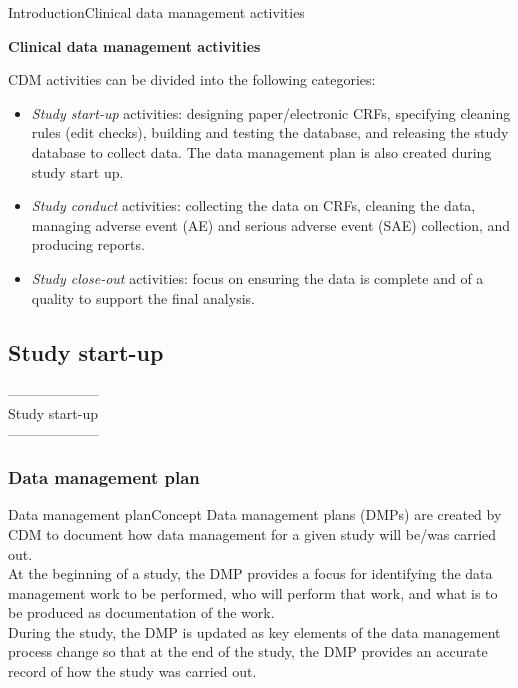 \documentclass[xcolor=dvipsnames,11pt]{beamer}
\begin{document}
\begin{frame}[fragile]{Introduction}{Clinical data management activities}

	\textbf{Clinical data management activities}\\
	\bigskip

	CDM activities can be divided into the following categories:  
	\begin{itemize}
		\item \textcolor{PineGreen}{\textit{Study start-up}} activities: designing paper/electronic CRFs, specifying cleaning rules (edit checks), building and testing the database, and releasing the study database to collect data. The data management plan is also created during study start up.
		\item \textcolor{PineGreen}{\textit{Study conduct}} activities: collecting the data on CRFs, cleaning the data, managing adverse event (AE) and serious adverse event (SAE) collection, and producing reports.
		\item \textcolor{PineGreen}{\textit{Study close-out}} activities: focus on ensuring the data is complete and of a quality to support the final analysis. 
	\end{itemize}
\end{frame}


\subsection{Study start-up}

\begin{frame}{}
	\bigskip\bigskip\bigskip\bigskip\bigskip\bigskip
	\begin{center}
		\textcolor{PineGreen}{--------------------\\Study start-up\\--------------------}
	\end{center}
\end{frame}

\subsubsection{Data management plan}

\begin{frame}[fragile]{Data management plan}{Concept}
	Data management plans (DMPs) are created by CDM to document how data management for a given study will be/was carried out.\\
	\bigskip
	At the beginning of a study, the DMP provides a focus for identifying the data management work to be performed, who will perform that work, and what is to be produced as documentation of the work.\\
	\bigskip
	During the study, the DMP is updated as key elements of the data management process change so that at the end of the study, the DMP provides an accurate record of how the study was carried out.\\	
\end{frame}
\end{document}
